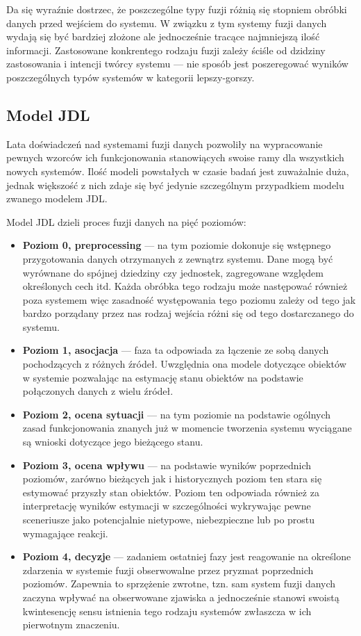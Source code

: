 \par{
Da się wyraźnie dostrzec, że poszczególne typy fuzji różnią się stopniem obróbki danych przed wejściem do systemu. W związku z tym systemy fuzji danych wydają się być bardziej złożone ale jednocześnie tracące najmniejszą ilość informacji. Zastosowane konkrentego rodzaju fuzji zależy ściśle od dzidziny zastosowania i intencji twórcy systemu --- nie sposób jest poszeregować wyników poszczególnych typów systemów w kategorii lepszy-gorszy.
}
\subsection{Model JDL}
\par{
Lata doświadczeń nad systemami fuzji danych pozwoliły na wypracowanie pewnych wzorców ich funkcjonowania stanowiących swoise ramy dla wszystkich nowych systemów. Ilość modeli powstałych w czasie badań jest zuważalnie duża, jednak większość z nich zdaje się być jedynie szczególnym przypadkiem modelu zwanego modelem JDL.
}
\par{
Model JDL dzieli proces fuzji danych na pięć poziomów:
\begin{itemize}
\item \textbf{Poziom 0, preprocessing} --- na tym poziomie dokonuje się wstępnego przygotowania danych otrzymanych z zewnątrz systemu. Dane mogą być wyrównane do spójnej dziedziny czy jednostek, zagregowane względem określonych cech itd. Każda obróbka tego rodzaju może następować również poza systemem więc zasadność występowania tego poziomu zależy od tego jak bardzo porządany przez nas rodzaj wejścia różni się od tego dostarczanego do systemu.
\item \textbf{Poziom 1, asocjacja} --- faza ta odpowiada za łączenie ze sobą danych pochodzących z różnych źródeł. Uwzględnia ona modele dotyczące obiektów w systemie pozwalając na estymację stanu obiektów na podstawie połączonych danych z wielu źródeł.
\item \textbf{Poziom 2, ocena sytuacji} --- na tym poziomie na podstawie ogólnych zasad funkcjonowania znanych już w momencie tworzenia systemu wyciągane są wnioski dotyczące jego bieżącego stanu.
\item \textbf{Poziom 3, ocena wpływu} --- na podstawie wyników poprzednich poziomów, zarówno bieżących jak i historycznych poziom ten stara się estymować przyszły stan obiektów. Poziom ten odpowiada również za interpretację wyników estymacji w szczególności wykrywając pewne sceneriusze jako potencjalnie nietypowe, niebezpieczne lub po prostu wymagające reakcji.
\item \textbf{Poziom 4, decyzje} --- zadaniem ostatniej fazy jest reagowanie na określone zdarzenia w systemie fuzji obserwowalne przez pryzmat poprzednich poziomów. Zapewnia to sprzężenie zwrotne, tzn. sam system fuzji danych zaczyna wpływać na obserwowane zjawiska a jednocześnie stanowi swoistą kwintesencję sensu istnienia tego rodzaju systemów zwłaszcza w ich pierwotnym znaczeniu.
\end{itemize}
}
